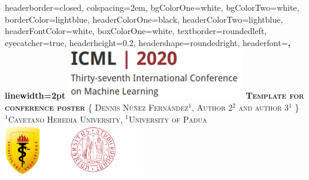 \documentclass[landscape,a0paper,fontscale=0.285]{baposter} %
\begin{document}
\begin{poster}
{
headerborder=closed, %
colspacing=2em, %
bgColorOne=white, %
bgColorTwo=white, %
borderColor=lightblue, %
headerColorOne=black, %
headerColorTwo=lightblue, %
headerFontColor=white, %
boxColorOne=white, %
textborder=roundedleft, %
eyecatcher=true, %
headerheight=0.2\textheight, %
headershape=roundedright, %
headerfont=\Large\bf\textsc, %
linewidth=2pt %
}
%
{\includegraphics[height=6em]{icml_logo.png}} %
{\bf\textsc{Template for conference poster}\vspace{0.4em}} %
{\textsc{\{ Dennis Núñez Fernández$^1$, Author 2$^2$ and author 3$^1$ \} \hspace{12pt} \\ $^1$Cayetano Heredia University, $^1$University of Padua}} %
{\includegraphics[height=6em]{logos_inst.png}} %


\end{poster}
\end{document}
